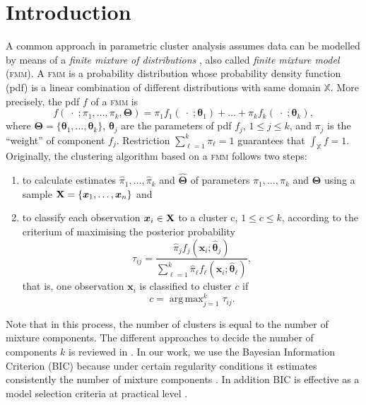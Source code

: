 \documentclass[submit]{smj}
\DeclareMathOperator*{\argmax}{arg\,max}
\theoremstyle{definition}
\newcommand{\m}[1]{\boldsymbol{#1}}
\newcommand{\fmm}{\textsc{fmm}\xspace}
\newcommand{\X}{\text{\textbf{X}}}
\begin{document}



\maketitle

\section{Introduction}


A common approach in parametric cluster analysis assumes data can be modelled by means of a \emph{finite mixture of distributions} \citep{fraley2002model, punzo2014flexible}, also called \emph{finite mixture model} (\fmm). A \fmm is a probability distribution whose probability density function (pdf) is a linear combination of different distributions with same domain $\mathbb{X}$. More precisely, the pdf $f$ of a \fmm is
\begin{equation}\label{mixt}
f(\;\cdot\; ; \pi_1, \dots, \pi_k, \m\Theta) = \pi_1 f_1(\;\cdot\; ; \m\theta_1) + \dots + \pi_k f_k(\;\cdot\; ; \m\theta_k),
\end{equation}
where $\m\Theta =\{ \m\theta_1, \dots, \m\theta_k\}$, $\m\theta_j$ are the parameters of pdf $f_j$, $1\leq j \leq k$, and $\pi_j$ is the ``weight'' of component $f_j$. Restriction $\sum_{\ell = 1}^k \pi_\ell = 1$ guarantees that  $\int_{\mathbb{X}}f = 1$. Originally, the clustering algorithm based on a \fmm follows two steps:
\begin{enumerate}
\item to calculate estimates $\hat{\pi}_1, \dots, \hat{\pi}_k$ and $\hat{\m\Theta}$ of parameters $\pi_1, \dots, \pi_k$ and $\m\Theta$ using a sample $\X=\{\m x_1, \dots, \m x_n\}$ and
\item to classify each observation $\m x_i \in \X$ to a cluster c, $1\leq c \leq k$, according to the criterium of maximising the posterior probability
\[
\tau_{ij}= \frac{ \hat{\pi}_j f_j(\m x_i ; \hat{\m\theta}_j) }{\sum_{\ell=1}^k \hat{\pi}_\ell f_\ell(\m x_i ; \hat{\m\theta}_\ell) },
\]
that is, one observation $\m x_i$ is classified to cluster $c$ if
\begin{equation}\label{map_criteria}
c = \argmax_{j=1}^k \tau_{ij}.
\end{equation}
\end{enumerate}
Note that in this process, the number of clusters is equal to the number of mixture components. The different approaches to decide the number of components $k$ is reviewed in \cite{mclachlan2014components}. In our work, we use the Bayesian Information Criterion (BIC) because under certain regularity conditions it estimates consistently the number of mixture components \citep{keribin1998consistent, keribin2000consistent}. In addition BIC is effective as a model selection criteria at practical level \citep{fraley1998how}.
\end{document}
